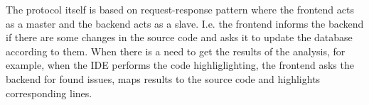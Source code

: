 The protocol itself is based on request-response pattern where the frontend acts as a master and the backend acts as a slave.
I.e. the frontend informs the backend if there are some changes in the source code and asks it to update the database according to them.
When there is a need to get the results of the analysis, for example, when the IDE performs the code highliglighting, the frontend asks the backend for found issues, maps results to the source code and highlights corresponding lines.
